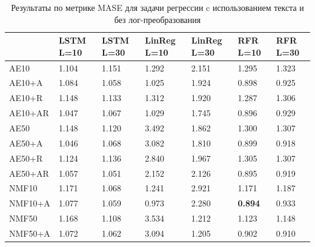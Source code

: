 \begin{center}
\begin{table}
 \begin{tabular}{||p{3.8cm}|p{1.5cm}|p{1.5cm}|p{1.5cm}|p{1.5cm}|p{1.5cm}|p{1.5cm}||} 
\hline
& LSTM L=10 & LSTM L=30 & LinReg L=10 & LinReg L=30 & RFR L=10 & RFR L=30\\ \hline\hline
AE10 & 1.104 & 1.151 & 1.292 & 2.151 & 1.295 & 1.323\\ \hline
AE10+A & 1.084 & 1.058 & 1.025 & 1.924 & 0.898 & 0.925\\ \hline
AE10+R & 1.148 & 1.133 & 1.312 & 1.920 & 1.287 & 1.306\\ \hline
AE10+AR & 1.047 & 1.067 & 1.029 & 1.745 & 0.896 & 0.929\\ \hline
AE50 & 1.148 & 1.120 & 3.492 & 1.862 & 1.300 & 1.307\\ \hline
AE50+A & 1.046 & 1.068 & 3.082 & 1.810 & 0.899 & 0.918\\ \hline
AE50+R & 1.124 & 1.136 & 2.840 & 1.967 & 1.305 & 1.307\\ \hline
AE50+AR & 1.057 & 1.051 & 2.152 & 2.126 & 0.895 & 0.919\\ \hline
NMF10 & 1.171 & 1.068 & 1.241 & 2.921 & 1.171 & 1.187\\ \hline
NMF10+A & 1.077 & 1.059 & 0.973 & 2.280 & \textbf{0.894} & 0.933\\ \hline
NMF50 & 1.168 & 1.108 & 3.534 & 1.212 & 1.123 & 1.148\\ \hline
NMF50+A & 1.072 & 1.062 & 3.094 & 1.205 & 0.902 & 0.910\\ \hline
\end{tabular}
\caption{\label{table:reg-res} Результаты по метрике MASE для задачи регрессии c использованием текста и без лог-преобразования}
\end{table}
\end{center}


